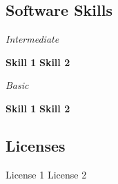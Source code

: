 \documentclass[a4paper]{cv-michele}
\begin{document}
\begin{minipage}[t]{0.71\linewidth}
\vspace{5pt}

\subsection*{Software Skills}\vspace{2.5pt}

\noindent\parbox[t]{0.175\textwidth}{\textsl{Intermediate}}
\parbox[t]{0.82\textwidth}{
	\textbf{Skill 1}
	\hspace{2.5pt}\ob\hspace{2.5pt}
	\textbf{Skill 2}
}
\noindent\parbox[t]{0.175\textwidth}{\textsl{Basic}}
\parbox[t]{0.82\textwidth}{
	\textbf{Skill 1}
	\hspace{2.5pt}\ob\hspace{2.5pt}
	\textbf{Skill 2}
}

\vspace{5pt}

\subsection*{Licenses}
License 1 \hspace{5pt}\ob\hspace{5pt} License 2

\vspace{15pt}




\end{minipage}

\vfill


\Footer
\end{document}
